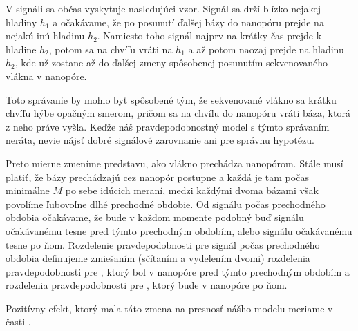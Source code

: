 V signáli sa občas vyskytuje nasledujúci vzor. Signál sa drží blízko nejakej hladiny $h_1$ a očakávame, 
že po posunutí ďalšej bázy do nanopóru prejde na nejakú inú hladinu $h_2$. Namiesto toho signál 
najprv na krátky čas prejde k hladine $h_2$, potom sa na chvíľu vráti na $h_1$ a až potom naozaj prejde
na hladinu $h_2$, kde už zostane až do ďalšej zmeny spôsobenej posunutím sekvenovaného vlákna v nanopóre.


Toto správanie by mohlo byť spôsobené tým, že sekvenované vlákno sa krátku chvíľu hýbe opačným smerom,
pričom sa na chvíľu do nanopóru vráti báza, ktorá z neho práve vyšla. Keďže náš pravdepodobnostný
model s týmto správaním neráta, nevie nájsť dobré signálové zarovnanie ani pre správnu hypotézu.

Preto mierne zmeníme predstavu, ako vlákno prechádza nanopórom. Stále musí platiť, že bázy prechádzajú 
cez
nanopór postupne a každá je tam počas minimálne $M$ po sebe idúcich meraní, medzi každými dvoma
bázami však povolíme ľubovoľne dlhé prechodné obdobie. Od signálu počas prechodného obdobia očakávame, 
že bude v každom momente podobný buď signálu očakávanému tesne pred týmto prechodným obdobím, alebo 
signálu očakávanému tesne po ňom. Rozdelenie pravdepodobnosti pre signál počas prechodného obdobia
definujeme zmiešaním (sčítaním a vydelením dvomi) rozdelenia pravdepodobnosti pre \kmer{}, ktorý bol 
v nanopóre pred týmto prechodným obdobím a rozdelenia pravdepodobnosti pre \kmer{}, ktorý
bude v nanopóre po ňom.

Pozitívny efekt, ktorý mala táto zmena na presnosť nášho modelu meriame v časti .
